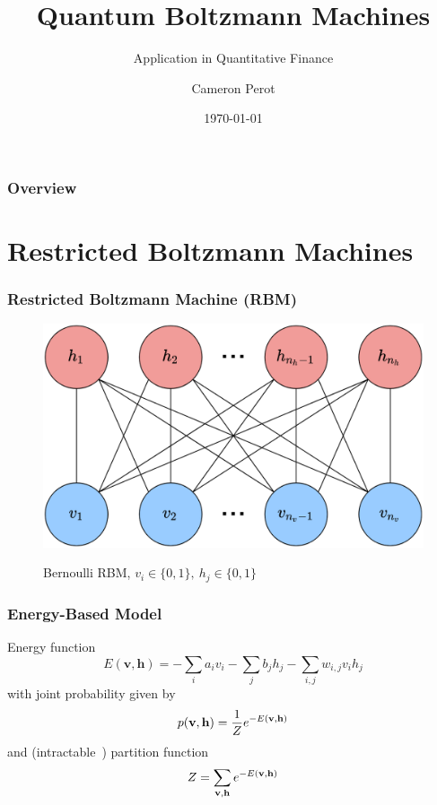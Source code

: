 \documentclass{beamer}
\title{Quantum Boltzmann Machines}
\subtitle{Application in Quantitative Finance}
\author{Cameron Perot}
\institute{JSC}
\date{\today}
\begin{document}

\maketitle


\begin{frame}
    \frametitle{Overview}
    \tableofcontents
\end{frame}


\section{Restricted Boltzmann Machines}

\begin{frame}
    \frametitle{Restricted Boltzmann Machine (RBM)}
    \begin{figure}
        \includegraphics[width=0.8\linewidth]{rbm_diagram.png}
        \label{rbm_diagram}
        \caption{Bernoulli RBM, \( v_i \in \{0, 1\}, \ h_j \in \{0, 1\} \)}
    \end{figure}
\end{frame}

\begin{frame}
    \frametitle{Energy-Based Model}
    Energy function
    \[
        E(\mathbf{v}, \mathbf{h}) = -\sum_i a_i v_i - \sum_j b_j h_j - \sum_{i,j} w_{i,j} v_i h_j
    \]
    with joint probability given by
    \[
        p(\mathbf{v}, \mathbf{h}) = \frac{1}{Z} e^{-E(\mathbf{v}, \mathbf{h})}
    \]
    and (intractable~\cite{long_servedio_2010}) partition function
    \[
        Z = \sum_{\mathbf{v},\mathbf{h}} e^{-E(\mathbf{v}, \mathbf{h})}
    \]
\end{frame}
\end{document}

